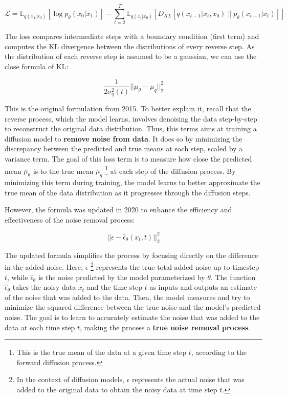 \begin{equation}
\mathcal{L} = \mathbb{E}_{q(x_1 | x_0)} \left[ \log p_{\theta}(x_0 | x_1) \right] - \sum_{t=2}^{T} \mathbb{E}_{q(x_t | x_0)} \left[ D_{KL} \left[ q(x_{t-1} | x_t, x_0) \| p_{\theta}(x_{t-1} | x_t) \right] \right]
\end{equation}

The loss compares intermediate steps with a boundary condition (first term) and computes the KL divergence between the distributions of every reverse step. As the distribution of each reverse step is assumed to be a gaussian, we can use the close formula of KL:




$$\frac{1}{2\sigma^2_q(t)}||\mu_{\theta}-\mu_q||^2_2$$

This is the original formulation from 2015. To better explain it, recall that the reverse process, which the model learns, involves denoising the data step-by-step to reconstruct the original data distribution. Thus, this terms aims at training a diffusion model to \textbf{remove noise from data}. It does so by minimizing the discrepancy between the predicted and true means at each step, scaled by a variance term. The goal of this loss term is to measure how close the predicted mean $\mu_\theta$ is to the true mean $\mu_q$ \footnote{ This is the true mean of the data at a given time step $t$, according to the forward diffusion process.} at each step of the diffusion process. By minimizing this term during training, the model learns to better approximate the true mean of the data distribution as it progresses through the diffusion steps. 

However, the formula was updated in 2020 to enhance the efficiency and effectiveness of the noise removal process:

$$||\epsilon - \hat{\epsilon}_{\theta}(x_t,t)||^{2}_2$$

The updated formula simplifies the process by focusing directly on the difference in the added noise. Here,  $\epsilon$ \footnote{In the context of diffusion models, $\epsilon$ represents the actual noise that was added to the original data to obtain the noisy data at time step $t$.} represents the true total added noise up to timestep $t$, while $\hat{\epsilon}_{\theta}$ is the noise predicted by the model parameterized by $\theta$. The function $\hat{\epsilon}_{\theta}$ takes the noisy data $x_t$ and the time step $t$ as inputs and outputs an estimate of the noise that was added to the data. Then, the model measures and try to minimize the squared difference between the true noise  and the model's predicted noise. The goal is to learn to accurately estimate the noise that was added to the data at each time step $t$, making the process a \textbf{true noise removal process}.

